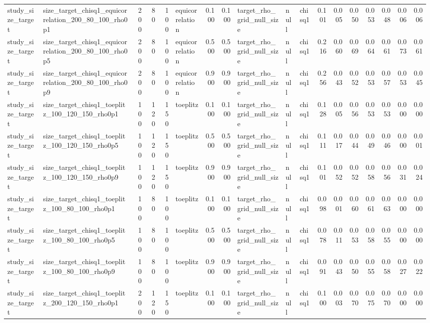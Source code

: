 \begin{tabular}{llrrrlrrlllrrrrrrr}
study\_size\_target & size\_target\_chisq1\_equicorrelation\_200\_80\_100\_rho0p1 & 200 & 80 & 100 & equicorrelation & 0.100 & 0.100 & target\_rho\_grid\_null\_size & null & chisq1 & 0.101 & 0.005 & 0.050 & 0.053 & 0.048 & 0.006 & 0.006 \\
study\_size\_target & size\_target\_chisq1\_equicorrelation\_200\_80\_100\_rho0p5 & 200 & 80 & 100 & equicorrelation & 0.500 & 0.500 & target\_rho\_grid\_null\_size & null & chisq1 & 0.216 & 0.060 & 0.069 & 0.064 & 0.061 & 0.073 & 0.061 \\
study\_size\_target & size\_target\_chisq1\_equicorrelation\_200\_80\_100\_rho0p9 & 200 & 80 & 100 & equicorrelation & 0.900 & 0.900 & target\_rho\_grid\_null\_size & null & chisq1 & 0.256 & 0.043 & 0.052 & 0.053 & 0.057 & 0.053 & 0.045 \\
study\_size\_target & size\_target\_chisq1\_toeplitz\_100\_120\_150\_rho0p1 & 100 & 120 & 150 & toeplitz & 0.100 & 0.100 & target\_rho\_grid\_null\_size & null & chisq1 & 0.128 & 0.005 & 0.056 & 0.053 & 0.053 & 0.000 & 0.000 \\
study\_size\_target & size\_target\_chisq1\_toeplitz\_100\_120\_150\_rho0p5 & 100 & 120 & 150 & toeplitz & 0.500 & 0.500 & target\_rho\_grid\_null\_size & null & chisq1 & 0.111 & 0.017 & 0.044 & 0.049 & 0.046 & 0.000 & 0.001 \\
study\_size\_target & size\_target\_chisq1\_toeplitz\_100\_120\_150\_rho0p9 & 100 & 120 & 150 & toeplitz & 0.900 & 0.900 & target\_rho\_grid\_null\_size & null & chisq1 & 0.101 & 0.052 & 0.052 & 0.058 & 0.056 & 0.031 & 0.024 \\
study\_size\_target & size\_target\_chisq1\_toeplitz\_100\_80\_100\_rho0p1 & 100 & 80 & 100 & toeplitz & 0.100 & 0.100 & target\_rho\_grid\_null\_size & null & chisq1 & 0.098 & 0.001 & 0.060 & 0.061 & 0.063 & 0.000 & 0.000 \\
study\_size\_target & size\_target\_chisq1\_toeplitz\_100\_80\_100\_rho0p5 & 100 & 80 & 100 & toeplitz & 0.500 & 0.500 & target\_rho\_grid\_null\_size & null & chisq1 & 0.078 & 0.011 & 0.053 & 0.058 & 0.055 & 0.000 & 0.000 \\
study\_size\_target & size\_target\_chisq1\_toeplitz\_100\_80\_100\_rho0p9 & 100 & 80 & 100 & toeplitz & 0.900 & 0.900 & target\_rho\_grid\_null\_size & null & chisq1 & 0.091 & 0.043 & 0.050 & 0.055 & 0.058 & 0.027 & 0.022 \\
study\_size\_target & size\_target\_chisq1\_toeplitz\_200\_120\_150\_rho0p1 & 200 & 120 & 150 & toeplitz & 0.100 & 0.100 & target\_rho\_grid\_null\_size & null & chisq1 & 0.100 & 0.003 & 0.070 & 0.075 & 0.070 & 0.000 & 0.000 \\

\end{tabular}
